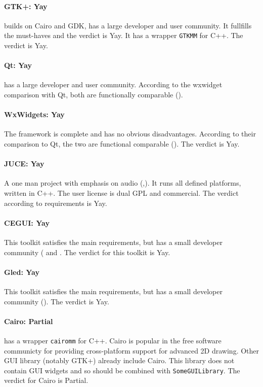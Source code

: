 \paragraph{GTK+: Yay} builds on Cairo and GDK, has a large developer and user
community.  It fullfills the must-haves and the verdict is Yay. It has a
wrapper \verb!GTKMM! for C++. The verdict is Yay.

\paragraph{Qt: Yay} has a large developer and user community. According to the
wxwidget comparison with Qt, both are functionally comparable
(\cite{wxwidget:comparison}).

\paragraph{WxWidgets: Yay} The framework is complete and has no obvious
disadvantages. According to their comparison to Qt, the two are functional
comparable (\cite{wxwidget:comparison}).  The verdict is Yay.

\paragraph{JUCE: Yay} A one man project with emphasis on audio
(\cite{juce:juce},\cite{wiki:juce}).  It runs all defined platforms, written in
C++. The user license is dual GPL and commercial.  The verdict according to
requirements is Yay.

\paragraph{CEGUI: Yay} This toolkit satisfies the main requirements, but has a
small developer community (\cite{wiki:cegui} and \cite{cegui:cegui}. The
verdict for this toolkit is Yay.

\paragraph{Gled: Yay} This toolkit satisfies the main requirements, but has a 
small developer community (\cite{gled:gled}). The verdict is Yay.

\paragraph{Cairo: Partial} has a wrapper \verb!cairomm! for C++.  Cairo is popular
in the free software communicty for providing cross-platform support for
advanced 2D drawing. Other GUI library (notably GTK+) already include Cairo.
This library does not contain GUI widgets and so should be combined with
\verb!SomeGUILibrary!. The verdict for Cairo is Partial.

